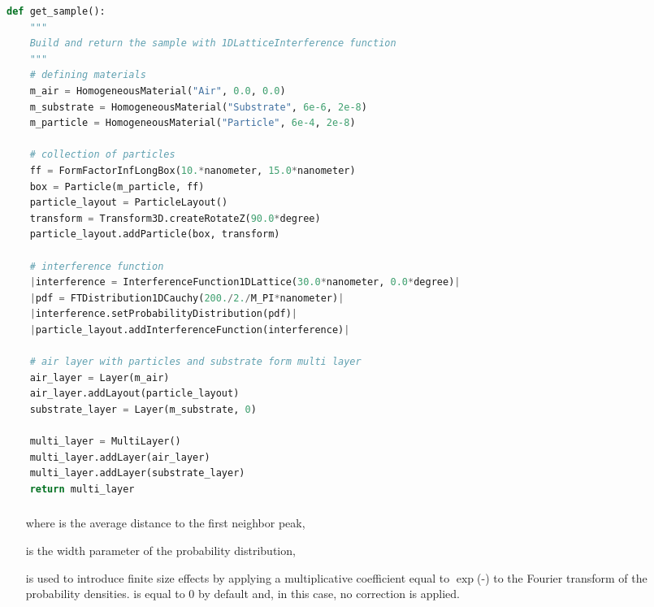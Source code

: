 \newpage
\begin{lstlisting}[language=python, style=eclipseboxed,numbers=none,nolol,caption={\Code{Python} script to generate a sample made of infinitely long boxes deposited on a substrate layer with the 1DLatticeInterference function. The part specific to the interferences is marked in a red italic font.},label={lst:1dlattinterf}]
def get_sample():
    """
    Build and return the sample with 1DLatticeInterference function
    """
    # defining materials
    m_air = HomogeneousMaterial("Air", 0.0, 0.0)
    m_substrate = HomogeneousMaterial("Substrate", 6e-6, 2e-8)
    m_particle = HomogeneousMaterial("Particle", 6e-4, 2e-8)

    # collection of particles
    ff = FormFactorInfLongBox(10.*nanometer, 15.0*nanometer)
    box = Particle(m_particle, ff)
    particle_layout = ParticleLayout()
    transform = Transform3D.createRotateZ(90.0*degree)
    particle_layout.addParticle(box, transform)

    # interference function
    |interference = InterferenceFunction1DLattice(30.0*nanometer, 0.0*degree)|
    |pdf = FTDistribution1DCauchy(200./2./M_PI*nanometer)|
    |interference.setProbabilityDistribution(pdf)|
    |particle_layout.addInterferenceFunction(interference)|

    # air layer with particles and substrate form multi layer
    air_layer = Layer(m_air)
    air_layer.addLayout(particle_layout)
    substrate_layer = Layer(m_substrate, 0)

    multi_layer = MultiLayer()
    multi_layer.addLayer(air_layer)
    multi_layer.addLayer(substrate_layer)
    return multi_layer
\end{lstlisting} 

\newpage
\subsubsection{}  
\begin{itemize}
\item[where]  is the average distance to the first neighbor peak, 
\item[] is the width parameter of the probability distribution,
\item[]  is used to introduce finite size effects by applying a multiplicative coefficient equal to  $\exp$(-) to the Fourier transform of the probability densities.  is equal to 0 by default and, in this case, no correction is applied.
\end{itemize}

